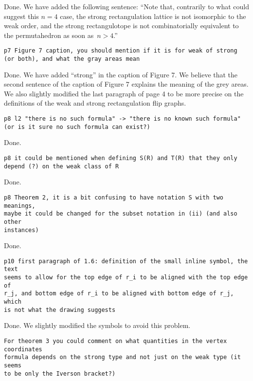 \documentclass{article}
\begin{document}
Done. We have added the following sentence: ``Note that, contrarily to what could suggest this $n = 4$ case, the strong rectangulation lattice is not isomorphic to the weak order, and the strong rectangulotope is not combinatorially equivalent to the permutahedron as soon as~$n > 4$.''

\begin{verbatim}
p7 Figure 7 caption, you should mention if it is for weak of strong 
(or both), and what the gray areas mean
\end{verbatim}

Done. We have added ``strong'' in the caption of Figure 7. We believe that the second sentence of the caption of Figure 7 explains the meaning of the grey areas. We also slightly modified the last paragraph of page 4 to be more precise on the definitions of the weak and strong rectangulation flip graphs.

\begin{verbatim}
p8 l2 "there is no such formula" -> "there is no known such formula" 
(or is it sure no such formula can exist?)
\end{verbatim}

Done.

\begin{verbatim}
p8 it could be mentioned when defining S(R) and T(R) that they only 
depend (?) on the weak class of R
\end{verbatim}

Done.

\begin{verbatim}
p8 Theorem 2, it is a bit confusing to have notation S with two meanings, 
maybe it could be changed for the subset notation in (ii) (and also other 
instances)
\end{verbatim}

Done.

\begin{verbatim}
p10 first paragraph of 1.6: definition of the small inline symbol, the text 
seems to allow for the top edge of r_i to be aligned with the top edge of 
r_j, and bottom edge of r_i to be aligned with bottom edge of r_j, which 
is not what the drawing suggests
\end{verbatim}

Done. We slightly modified the symbols to avoid this problem.

\begin{verbatim}
For theorem 3 you could comment on what quantities in the vertex coordinates 
formula depends on the strong type and not just on the weak type (it seems 
to be only the Iverson bracket?)
\end{verbatim}
\end{document}
